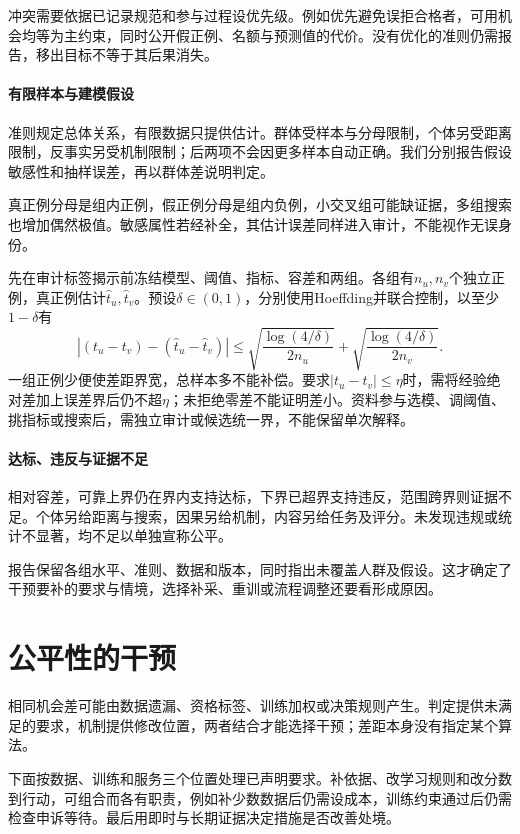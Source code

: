 冲突需要依据已记录规范和参与过程设优先级。例如优先避免误拒合格者，可用机会均等为主约束，同时公开假正例、名额与预测值的代价。没有优化的准则仍需报告，移出目标不等于其后果消失。

\paragraph{有限样本与建模假设}
\label{sec:fairness-evidence}

准则规定总体关系，有限数据只提供估计。群体受样本与分母限制，个体另受距离限制，反事实另受机制限制；后两项不会因更多样本自动正确。我们分别报告假设敏感性和抽样误差，再以群体差说明判定。

真正例分母是组内正例，假正例分母是组内负例，小交叉组可能缺证据，多组搜索也增加偶然极值。敏感属性若经补全，其估计误差同样进入审计，不能视作无误身份。

先在审计标签揭示前冻结模型、阈值、指标、容差和两组。各组有$n_u,n_v$个独立正例，真正例估计$\hat t_u,\hat t_v$。预设$\delta\in(0,1)$，分别使用Hoeffding并联合控制，以至少$1-\delta$有
\[
 |(t_u-t_v)-(\hat t_u-\hat t_v)|
 \leq
 \sqrt{\frac{\log(4/\delta)}{2n_u}}
 +\sqrt{\frac{\log(4/\delta)}{2n_v}}.
\]
一组正例少便使差距界宽，总样本多不能补偿。要求$|t_u-t_v|\leq\eta$时，需将经验绝对差加上误差界后仍不超$\eta$；未拒绝零差不能证明差小。资料参与选模、调阈值、挑指标或搜索后，需独立审计或候选统一界，不能保留单次解释。

\paragraph{达标、违反与证据不足}

相对容差，可靠上界仍在界内支持达标，下界已超界支持违反，范围跨界则证据不足。个体另给距离与搜索，因果另给机制，内容另给任务及评分。未发现违规或统计不显著，均不足以单独宣称公平。

报告保留各组水平、准则、数据和版本，同时指出未覆盖人群及假设。这才确定了干预要补的要求与情境，选择补采、重训或流程调整还要看形成原因。

\section{公平性的干预}
\label{sec:fairness-intervention}

相同机会差可能由数据遗漏、资格标签、训练加权或决策规则产生。判定提供未满足的要求，机制提供修改位置，两者结合才能选择干预；差距本身没有指定某个算法。

下面按数据、训练和服务三个位置处理已声明要求。补依据、改学习规则和改分数到行动，可组合而各有职责，例如补少数数据后仍需设成本，训练约束通过后仍需检查申诉等待。最后用即时与长期证据决定措施是否改善处境。

